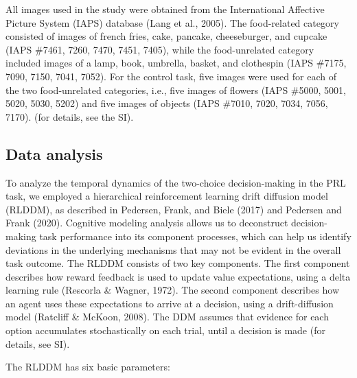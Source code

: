 \documentclass[
  man,floatsintext]{apa6}
\begin{document}
All images used in the study were obtained from the International Affective Picture System (IAPS) database (Lang et al., 2005). The food-related category consisted of images of french fries, cake, pancake, cheeseburger, and cupcake (IAPS \#7461, 7260, 7470, 7451, 7405), while the food-unrelated category included images of a lamp, book, umbrella, basket, and clothespin (IAPS \#7175, 7090, 7150, 7041, 7052). For the control task, five images were used for each of the two food-unrelated categories, i.e., five images of flowers (IAPS \#5000, 5001, 5020, 5030, 5202) and five images of objects (IAPS \#7010, 7020, 7034, 7056, 7170). (for details, see the SI).

\hypertarget{data-analysis}{%
\subsection{Data analysis}\label{data-analysis}}

To analyze the temporal dynamics of the two-choice decision-making in the PRL task, we employed a hierarchical reinforcement learning drift diffusion model (RLDDM), as described in Pedersen, Frank, and Biele (2017) and Pedersen and Frank (2020). Cognitive modeling analysis allows us to deconstruct decision-making task performance into its component processes, which can help us identify deviations in the underlying mechanisms that may not be evident in the overall task outcome. The RLDDM consists of two key components. The first component describes how reward feedback is used to update value expectations, using a delta learning rule (Rescorla \& Wagner, 1972). The second component describes how an agent uses these expectations to arrive at a decision, using a drift-diffusion model (Ratcliff \& McKoon, 2008). The DDM assumes that evidence for each option accumulates stochastically on each trial, until a decision is made (for details, see SI).

The RLDDM has six basic parameters:
\end{document}
